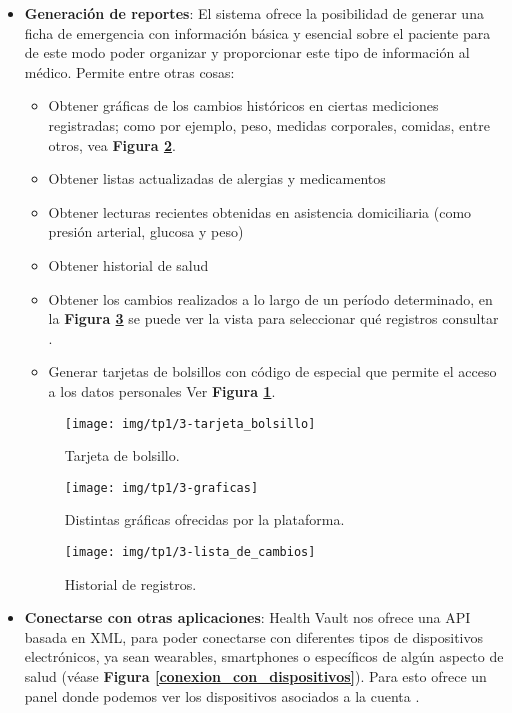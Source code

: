 \begin{itemize}
\item \textbf{Generación de reportes}: El sistema ofrece la posibilidad de generar una ficha de emergencia con información básica y esencial sobre el paciente para de este modo poder organizar y proporcionar este tipo de información al médico. Permite entre otras cosas:
	\begin{itemize}
		\item Obtener gráficas de los cambios históricos en ciertas mediciones registradas; como por ejemplo, peso, medidas corporales, comidas, entre otros, vea \textbf{Figura \ref{graficas}}.
        \item Obtener listas actualizadas de alergias y medicamentos
		\item Obtener lecturas recientes obtenidas en asistencia domiciliaria (como presión arterial, glucosa y peso)
		\item Obtener historial de salud
        \item Obtener los cambios realizados a lo largo de un período determinado, en la \textbf{Figura \ref{lista_de_cambios}} se puede ver la vista para seleccionar qué registros consultar .
        \item Generar tarjetas de bolsillos con código de especial que permite el acceso a los datos personales Ver \textbf{Figura \ref{tarjeta_bolsillo}}.
	\end{itemize}
    
    \begin{figure}[h]
      \centering
      \texttt{[image: img/tp1/3-tarjeta\_bolsillo]}
      \caption{Tarjeta de bolsillo.}
      \label{tarjeta_bolsillo}
    \end{figure} 
    
    \begin{figure}[h]
      \centering
      \texttt{[image: img/tp1/3-graficas]}
      \caption{Distintas gráficas ofrecidas por la plataforma.}
      \label{graficas}
    \end{figure} 
    
    \begin{figure}[h]
      \centering
      \texttt{[image: img/tp1/3-lista\_de\_cambios]}
      \caption{Historial de registros.}
      \label{lista_de_cambios}
    \end{figure} 
  
\item \textbf{Conectarse con otras aplicaciones}: Health Vault nos ofrece una API basada en XML, para poder conectarse con diferentes tipos de dispositivos electrónicos, ya sean wearables, smartphones o específicos de algún aspecto de salud (véase \textbf{Figura \ref{conexion_con_dispositivos}}). Para esto ofrece un panel donde podemos ver los dispositivos asociados a la cuenta . 


\end{itemize}
